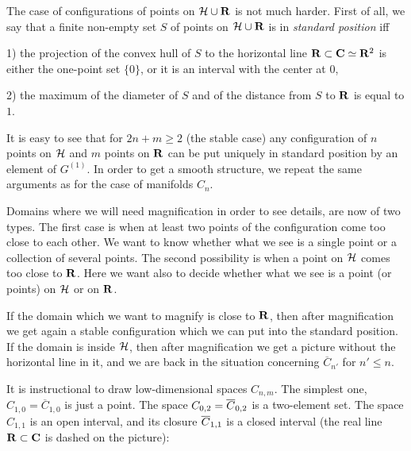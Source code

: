               
              The case of configurations of points on ${\cal H}\cup {\bf R}$
              is not much harder.
         First of all, we say that a finite non-empty set $S$ 
    of points on ${\cal H}\cup{\bf R}$
    is in  {\it standard position} iff 
    
    1) the  projection of the convex hull of
     $S$ to the horizontal line ${\bf R}\subset {\bf C}\simeq {\bf R}^2$ is either
     the  one-point set $\{0\}$, or it is an interval
      with the center at $0$,
    
    2) the maximum of the diameter of $S$ and of the distance from
     $S$ to ${\bf R}$ is equal to $1$.
     
     It is easy to see that for $2n+m\ge 2$ (the stable case) any 
     configuration
      of $n$ points on ${\cal H}$ and $m$ points on ${\bf R}$ can be put uniquely
        in standard position by an element of $G^{(1)}$. 
       In order to get a smooth structure, we 
       repeat the same arguments as for the case of manifolds $C_n$.
       
       
     Domains where we will need magnification in order to see details,
      are now of two types.
      The first case is when at least two points of the configuration
       come too close to each other. We want to know whether
        what we see is a single point or a collection
         of several points. The second possibility
        is when a point on ${\cal H}$ comes too close to ${\bf R}$. Here we want also
        to 
        decide whether what we see is a point (or points)
        on ${\cal H}$ or on ${\bf R}$. 
      
      If the domain which we want to magnify is close to ${\bf R}$, then after
        magnification 
       we get again a stable configuration which we can put into the 
       standard
       position. 
        If the domain   is inside ${\cal H}$, then after  magnification we get a 
        picture
         without the horizontal line in it, and we are back
          in the situation concerning ${\overline C}_{n'}$ for 
           $n'\le n$.
          
          It is instructional to draw low-dimensional spaces $C_{n,m}$.
           The simplest one, $C_{1,0}={\overline C}_{1,0}$ is just a point.
            The space $C_{0,2}={\overline C}_{0,2}$ is a two-element set.
            The space $C_{1,1}$ is an open interval, and its closure
             ${\overline C}_{1,1}$ is a closed interval (the real line ${\bf R}\subset{\bf C}$
              is dashed on the picture):
             
             \vskip 1cm
            \centerline{
}
\vskip 11mm
             
